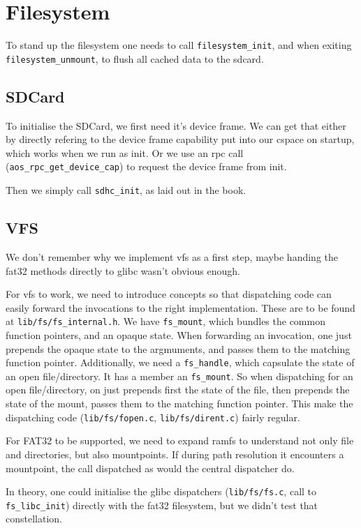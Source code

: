 \chapter{Filesystem}

To stand up the filesystem one needs to call \verb|filesystem_init|, and when
exiting \verb|filesystem_unmount|, to flush all cached data to the sdcard.

\section{SDCard}

To initialise the SDCard, we first need it's device frame.
We can get that either by directly refering to the device frame capability put
into our cspace on startup, which works when we run as init.
Or we use an rpc call (\verb|aos_rpc_get_device_cap|) to request the device
frame from init.

Then we simply call \verb|sdhc_init|, as laid out in the book.

\section{VFS}

We don't remember why we implement vfs as a first step, maybe handing the fat32
methods directly to glibc wasn't obvious enough.

For vfs to work, we need to introduce concepts so that dispatching code can
easily forward the invocations to the right implementation.
These are to be found at \verb|lib/fs/fs_internal.h|.
We have \verb|fs_mount|, which bundles the common function pointers, and an
opaque state.
When forwarding an invocation, one just prepends the opaque state to the
argmuments, and passes them to the matching function pointer.
Additionally, we need a \verb|fs_handle|, which capsulate the state of an open
file/directory.
It has a member an \verb|fs_mount|.
So when dispatching for an open file/directory, on just prepends first the state
of the file, then prepends the state of the mount, passes them to the matching
function pointer.
This make the dispatching code (\verb|lib/fs/fopen.c|,
\verb|lib/fs/dirent.c|) fairly regular.

For FAT32 to be supported, we need to expand ramfs to understand not only file
and directories, but also mountpoints. If during path resolution it encounters a
mountpoint, the call dispatched as would the central dispatcher do.

In theory, one could initialise the glibc dispatchers (\verb|lib/fs/fs.c|, call
to \verb|fs_libc_init|) directly with the fat32 filesystem, but we didn't test
that constellation.

